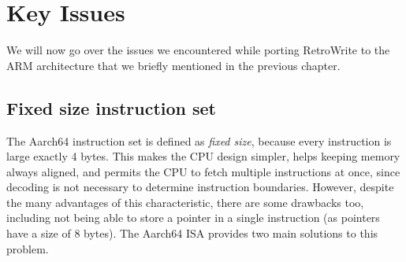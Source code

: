 \documentclass[a4paper,11pt,oneside]{report}
\newcommand{\sysname}{RetroWrite\xspace}
\newcommand{\todo}[1]{%
	\begingroup 
	\sethlcolor{cyan}%
	\hl{TODO: #1}%
	\endgroup
}
\begin{document}
	 

\section{Key Issues}
We will now go over the issues we encountered while porting \sysname to the 
ARM architecture that we briefly mentioned in the previous chapter.  

\subsection{Fixed size instruction set}
The Aarch64 instruction set is defined as \emph{fixed size}, because every 
instruction is large exactly 4 bytes. This makes the CPU design simpler,
helps keeping memory always aligned, and permits the CPU to fetch multiple 
instructions at once, since decoding is not necessary to determine instruction 
boundaries. However, despite the many advantages of this characteristic, there 
are some drawbacks too, including not being able to store a pointer in a single 
instruction (as pointers have a size of 8 bytes). The Aarch64 ISA provides two 
main solutions to this problem. 
\end{document}
